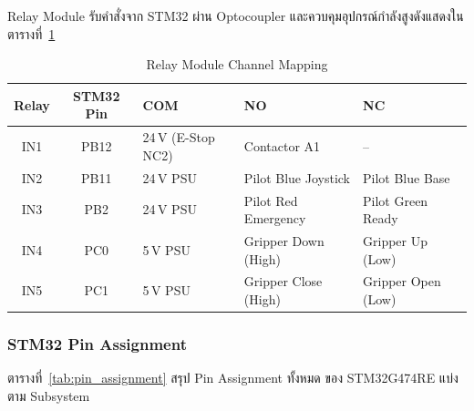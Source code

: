 Relay Module รับคำสั่งจาก STM32 ผ่าน Optocoupler
และควบคุมอุปกรณ์กำลังสูงดังแสดงในตารางที่~\ref{tab:relay_mapping}

\begin{table}[H]
  \centering
  \caption{Relay Module Channel Mapping}
  \label{tab:relay_mapping}
  \begin{tabular}{cclll}
    \toprule
    Relay & STM32 Pin & COM & NO & NC \\
    \midrule
    IN1 & PB12 & 24\,V (E-Stop NC2) & Contactor A1       & --                  \\
    IN2 & PB11 & 24\,V PSU          & Pilot Blue Joystick & Pilot Blue Base     \\
    IN3 & PB2  & 24\,V PSU          & Pilot Red Emergency & Pilot Green Ready   \\
    IN4 & PC0  & 5\,V PSU           & Gripper Down (High) & Gripper Up (Low)    \\
    IN5 & PC1  & 5\,V PSU           & Gripper Close (High)& Gripper Open (Low)  \\
    \bottomrule
  \end{tabular}
\end{table}

\subsubsection{STM32 Pin Assignment}
\label{subsubsec:stm32_pin_assignment}

ตารางที่~\ref{tab:pin_assignment} สรุป Pin Assignment ทั้งหมด
ของ STM32G474RE แบ่งตาม Subsystem


